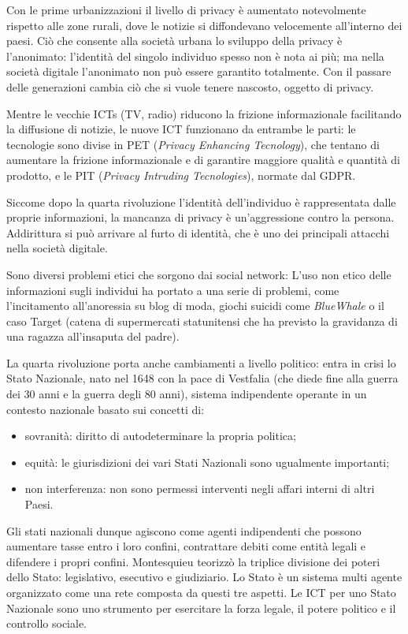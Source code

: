 \documentclass[a4page, 11pt]{article}
\begin{document}
Con le prime urbanizzazioni il livello di privacy è aumentato notevolmente rispetto alle zone rurali, dove le notizie si diffondevano velocemente all'interno dei paesi.
Ciò che consente alla società urbana lo sviluppo della privacy è l'anonimato: l'identità del singolo individuo spesso non è nota ai più; ma nella società digitale l'anonimato non può essere garantito totalmente.
Con il passare delle generazioni cambia ciò che si vuole tenere nascosto, oggetto di privacy.

Mentre le vecchie ICTs (TV, radio) riducono la frizione informazionale facilitando la diffusione di notizie, le nuove ICT funzionano da entrambe le parti: le tecnologie sono divise in PET (\textit{Privacy Enhancing Tecnology}), che tentano di aumentare la frizione informazionale e di garantire maggiore qualità e quantità di prodotto, e le PIT (\textit{Privacy Intruding Tecnologies}), normate dal GDPR.

Siccome dopo la quarta rivoluzione l'identità dell'individuo è rappresentata dalle proprie informazioni, la mancanza di privacy è un'aggressione contro la persona.
Addirittura si può arrivare al furto di identità, che è uno dei principali attacchi nella società digitale.


Sono diversi problemi etici che sorgono dai social network:
L'uso non etico delle informazioni sugli individui ha portato a una serie di problemi, come l'incitamento all'anoressia su blog di moda, giochi suicidi come \textit{BlueWhale} o il caso Target (catena di supermercati statunitensi che ha previsto la gravidanza di una ragazza all'insaputa del padre).

La quarta rivoluzione porta anche cambiamenti a livello politico: entra in crisi lo Stato Nazionale, nato nel 1648 con la pace di Vestfalia (che diede fine alla guerra dei 30 anni e la guerra degli 80 anni), sistema indipendente operante in un contesto nazionale basato sui concetti di:
\begin{itemize}
  \item sovranità: diritto di autodeterminare la propria politica;
  \item equità: le giurisdizioni dei vari Stati Nazionali sono ugualmente importanti;
  \item non interferenza: non sono permessi interventi negli affari interni di altri Paesi.
\end{itemize}
Gli stati nazionali dunque agiscono come agenti indipendenti che possono aumentare tasse entro i loro confini, contrattare debiti come entità legali e difendere i propri confini.
Montesquieu teorizzò la triplice divisione dei poteri dello Stato: legislativo, esecutivo e giudiziario.
Lo Stato è un sistema multi agente organizzato come una rete composta da questi tre aspetti.
Le ICT per uno Stato Nazionale sono uno strumento per esercitare la forza legale, il potere politico e il controllo sociale.
\end{document}
